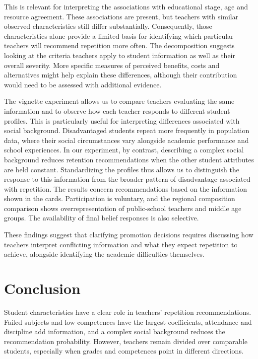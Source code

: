 This is relevant for interpreting the associations with educational stage, age and resource agreement. These associations are present, but teachers with similar observed characteristics still differ substantially. Consequently, those characteristics alone provide a limited basis for identifying which particular teachers will recommend repetition more often. The decomposition suggests looking at the criteria teachers apply to student information as well as their overall severity. More specific measures of perceived benefits, costs and alternatives might help explain these differences, although their contribution would need to be assessed with additional evidence.

The vignette experiment allows us to compare teachers evaluating the same information and to observe how each teacher responds to different student profiles. This is particularly useful for interpreting differences associated with social background. Disadvantaged students repeat more frequently in population data, where their social circumstances vary alongside academic performance and school experiences. In our experiment, by contrast, describing a complex social background reduces retention recommendations when the other student attributes are held constant. Standardizing the profiles thus allows us to distinguish the response to this information from the broader pattern of disadvantage associated with repetition. The results concern recommendations based on the information shown in the cards. Participation is voluntary, and the regional composition comparison shows overrepresentation of public-school teachers and middle age groups. The availability of final belief responses is also selective.

These findings suggest that clarifying promotion decisions requires discussing how teachers interpret conflicting information and what they expect repetition to achieve, alongside identifying the academic difficulties themselves.

\enlargethispage{2\baselineskip}
\section{Conclusion}\label{sec:conclusion}
Student characteristics have a clear role in teachers' repetition recommendations. Failed subjects and low competences have the largest coefficients, attendance and discipline add information, and a complex social background reduces the recommendation probability. However, teachers remain divided over comparable students, especially when grades and competences point in different directions.

